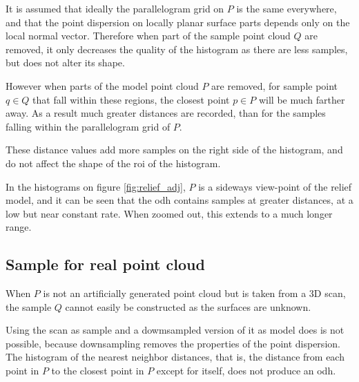 It is assumed that ideally the parallelogram grid on $P$ is the same everywhere, and that the point dispersion on locally planar surface parts depends only on the local normal vector. Therefore when part of the sample point cloud $Q$ are removed, it only decreases the quality of the histogram as there are less samples, but does not alter its shape.

However when parts of the model point cloud $P$ are removed, for sample point $q \in Q$ that fall within these regions, the closest point $p \in P$ will be much farther away. As a result much greater distances are recorded, than for the samples falling within the parallelogram grid of $P$.

These distance values add more samples on the right side of the histogram, and do not affect the shape of the \gls{roi} of the histogram.

In the histograms on figure \ref{fig:relief_adj}, $P$ is a sideways view-point of the relief model, and it can be seen that the \gls{odh} contains samples at greater distances, at a low but near constant rate. When zoomed out, this extends to a much longer range.


\subsection{Sample for real point cloud}
When $P$ is not an artificially generated point cloud but is taken from a 3D scan, the sample $Q$ cannot easily be constructed as the surfaces are unknown.

Using the scan as sample and a dowmsampled version of it as model does is not possible, because downsampling removes the properties of the point dispersion. The histogram of the nearest neighbor distances, that is, the distance from each point in $P$ to the closest point in $P$ except for itself, does not produce an \gls{odh}.

